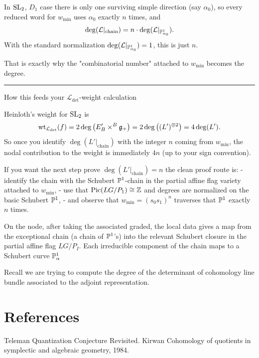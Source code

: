 \documentclass[12pt]{article}
\begin{document}
In $\SL_2$, $D_1$ case there is only one surviving simple direction (say $\alpha_0$), so every reduced word for $w_{\min}$ uses $\alpha_0$ exactly $n$ times, and
\[
\deg(\mathcal L|_{\text{chain}})=n\cdot \deg(\mathcal L|_{\P^1_{\alpha_0}}).
\]
With the standard normalization $\deg(\mathcal L|_{\P^1_{\alpha_0}})=1$, this is just $n$.

That is exactly why the "combinatorial number" attached to $w_{\min}$ becomes the degree.

\noindent\rule{\textwidth}{0.5pt}

How this feeds your $\mathcal L_{\det}$-weight calculation

Heinloth's weight for $\SL_2$ is
\[
\wt_{\mathcal L_{\det}}(f)=2\deg\big(E'_B\times^B\mf g_+\big)
=2\deg\big((L')^{\otimes 2}\big)=4\deg(L').
\]
So once you identify $\deg(L'|_{\text{chain}})$ with the integer $n$ coming from $w_{\min}$, the nodal contribution to the weight is immediately $4n$ (up to your sign convention).

If you want the next step prove $\deg(L'|_{\text{chain}})=n$ the clean proof route is:
- identify the chain with the Schubert \(\P^1\)-chain in the partial affine flag variety attached to $w_{\min}$,
- use that \(\Pic(LG/P_1)\cong \Z\) and degrees are normalized on the basic Schubert \(\P^1\),
- and observe that $w_{\min}=(s_0s_1)^n$ traverses that \(\P^1\) exactly $n$ times.

On the node, after taking the associated graded, the local data gives a map from the exceptional chain (a chain of \(\P^1\)’s) into the relevant Schubert closure in the partial affine flag $LG/P_I$. Each irreducible component of the chain maps to a Schubert curve \(\P^1_\alpha\)

Recall we are trying to compute the degree of the determinant of cohomology line bundle associated to the adjoint representation.

\section{References}
Teleman Quantization Conjecture Revisited.
Kirwan Cohomology of quotients in symplectic and algebraic geometry, 1984.
\end{document}
